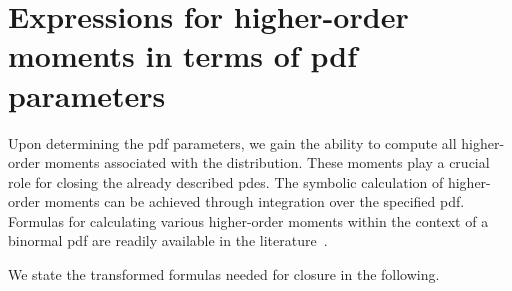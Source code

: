 \section{Expressions for higher-order moments in terms of pdf parameters}
\label{sec:expressions-for-higher-order-moments-in-terms-of-pdf-parameters}

Upon determining the \gls{pdf} parameters,
we gain the ability to compute all higher-order moments associated with the distribution.
These moments play a crucial role for closing the already described \glspl{pde}.
The symbolic calculation of higher-order moments can be achieved
through integration over the specified \gls{pdf}.
Formulas for calculating various higher-order moments within the context of a binormal \gls{pdf}
are readily available in the literature~\cite{larson2005using}.

We state the transformed formulas needed for closure in the following.

